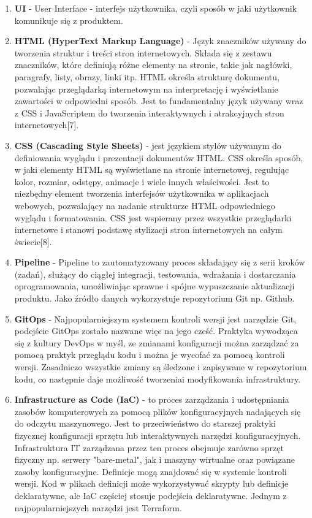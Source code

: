 \begin{enumerate}
    \item {\bf UI} - User Interface - interfejs użytkownika, czyli sposób w jaki użytkownik komunikuje się z produktem.
   
    \item {\bf HTML (HyperText Markup Language)} - Język znaczników używany do tworzenia struktur i treści stron internetowych. Składa się z zestawu znaczników, które definiują różne elementy na stronie, takie jak nagłówki, paragrafy, listy, obrazy, linki itp. HTML określa strukturę dokumentu, pozwalając przeglądarką internetowym na interpretację i wyświetlanie zawartości w odpowiedni sposób. Jest to fundamentalny język używany wraz z CSS i JavaScriptem do tworzenia interaktywnych i atrakcyjnych stron internetowych[7].
    
    \item {\bf CSS (Cascading Style Sheets)} - jest językiem stylów używanym do definiowania wyglądu i prezentacji dokumentów HTML. CSS określa sposób, w jaki elementy HTML są wyświetlane na stronie internetowej, regulując kolor, rozmiar, odstępy, animacje i wiele innych właściwości. Jest to niezbędny element tworzenia interfejsów użytkownika w aplikacjach webowych, pozwalający na nadanie strukturze HTML odpowiedniego wyglądu i formatowania. CSS jest wspierany przez wszystkie przeglądarki internetowe i stanowi podstawę stylizacji stron internetowych na całym świecie[8].

    \item {\bf Pipeline} - Pipeline to zautomatyzowany proces składający się z serii kroków (zadań), służący do ciągłej integracji, testowania, wdrażania i dostarczania oprogramowania, umożliwiając sprawne i spójne wypuszczanie aktualizacji produktu. Jako źródło danych wykorzystuje repozytorium Git np. Github.

    \item {\bf GitOps} - Najpopularniejszym systemem kontroli wersji jest narzędzie Git, podejście GitOps zostało nazwane więc na jego cześć. Praktyka wywodząca się z kultury DevOps w myśl, ze zmianami konfiguracji można zarządzać za pomocą praktyk przeglądu kodu i można je wycofać za pomocą kontroli wersji. Zasadniczo wszystkie zmiany są śledzone i zapisywane w repozytorium kodu, co następnie daje możliwość tworzenia\linebreak i modyfikowania infrastruktury.

    \item {\bf Infrastructure as Code (IaC)} - to proces zarządzania i udostępniania zasobów komputerowych za pomocą plików konfiguracyjnych nadających się do odczytu maszynowego. Jest to przeciwieństwo do starszej praktyki fizycznej konfiguracji sprzętu lub interaktywnych narzędzi konfiguracyjnych. Infrastruktura IT zarządzana przez ten proces obejmuje zarówno sprzęt fizyczny np. serwery "bare-metal", jak i maszyny wirtualne oraz powiązane zasoby konfiguracyjne. Definicje mogą znajdować się w systemie kontroli wersji. Kod w plikach definicji może wykorzystywać skrypty lub definicje deklaratywne, ale IaC częściej stosuje podejścia deklaratywne. Jednym z najpopularniejszych narzędzi jest Terraform.
     
 \end{enumerate}